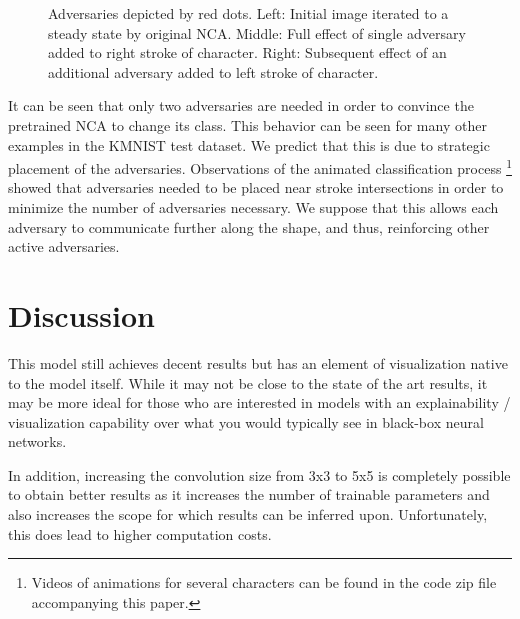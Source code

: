 \documentclass[conference]{IEEEtran}
\begin{document}
\begin{figure}[htbp]
\caption{ Adversaries depicted by red dots. Left:  Initial image iterated to a steady state by original NCA.  Middle:  Full effect of single adversary added to right stroke of character.  Right:  Subsequent effect of an additional adversary added to left stroke of character.}
\label{kmnistadvex}
\end{figure}

It can be seen that only two adversaries are needed in order to convince the pretrained NCA to change its class. This behavior can be seen for many other examples in the KMNIST test dataset. We predict that this is due to strategic placement of the adversaries. Observations of the animated classification process \footnote{Videos of animations for several characters can be found in the code zip file accompanying this paper. } showed that adversaries needed to be placed near stroke intersections in order to minimize the number of adversaries necessary.  We suppose that this allows each adversary to communicate further along the shape, and thus, reinforcing other active adversaries.

\section{Discussion}

This model still achieves decent results but has an element of visualization native to the model itself. While it may not be close to the state of the art results, it may be more ideal for those who are interested in models with an explainability / visualization capability over what you would typically see in black-box neural networks. 

In addition, increasing the convolution size from 3x3 to 5x5 is completely possible to obtain better results as it increases the number of trainable parameters and also increases the scope for which results can be inferred upon. Unfortunately, this does lead to higher computation costs.
\end{document}
